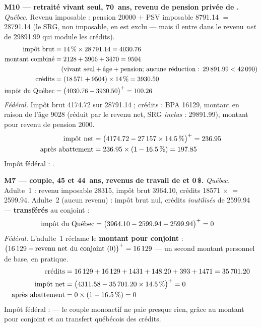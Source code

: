\medskip\noindent\textbf{M10 --- retraité vivant seul, 70~ans, revenu de pension privée de .}
\emph{Québec.} Revenu imposable : pension \num{20000} $+$ PSV
imposable \num{8791.14} $=$ \num{28791.14} (le SRG, non imposable, en est
exclu — mais il entre dans le revenu \emph{net} de \num{29891.99} qui
module les crédits).
\begin{align*}
\text{impôt brut} &= \num{14}\,\% \times \num{28791.14} = \num{4030.76} \\
\text{montant combiné} &= \num{2128} + \num{3906} + \num{3470} = \num{9504} \\
&\quad (\text{vivant seul} + \text{âge} + \text{pension; aucune réduction : } \num{29891.99} < \num{42090}) \\
\text{crédits} &= (\num{18571} + \num{9504}) \times \num{14}\,\% = \num{3930.50} \\
\text{impôt du Québec} &= \bigl(\num{4030.76} - \num{3930.50}\bigr)^{+} = \num{100.26}
\end{align*}
\emph{Fédéral.} Impôt brut \num{4174.72} sur \num{28791.14} ; crédits :
BPA \num{16129}, montant en raison de l'âge \num{9028}
(réduit par le revenu net, SRG \emph{inclus} : \num{29891.99}), montant pour
revenu de pension \num{2000}.
\begin{align*}
\text{impôt net} &= \bigl(\num{4174.72} - \num{27157} \times \num{14.5}\,\%\bigr)^{+} = \num{236.95} \\
\text{après abattement} &= \num{236.95} \times (1 - \num{16.5}\,\%) = \num{197.85}
\end{align*}
Impôt fédéral : .

\medskip\noindent\textbf{M7 --- couple, 45 et 44~ans, revenus de travail de  et 0\,\$.}
\emph{Québec.} Adulte~1 : revenu imposable \num{28315}, impôt brut
\num{3964.10}, crédits \num{18571} $\times$  $=$ \num{2599.94}.
Adulte~2 (aucun revenu) : impôt brut nul, crédits \emph{inutilisés} de
\num{2599.94} — \textbf{transférés} au conjoint :
\begin{align*}
\text{impôt du Québec} &= \bigl(\num{3964.10} - \num{2599.94} - \num{2599.94}\bigr)^{+} = \num{0}
\end{align*}
\emph{Fédéral.} L'adulte~1 réclame le \textbf{montant pour conjoint} :
$\bigl(\num{16129} - \text{revenu net du conjoint } (0)\bigr)^{+} = \num{16129}$ —
un second montant personnel de base, en pratique.
\begin{align*}
\text{crédits} &= \num{16129} + \num{16129} + \num{1431} + \num{148.20} + \num{393} + \num{1471} = \num{35701.20} \\
\text{impôt net} &= \bigl(\num{4311.58} - \num{35701.20} \times \num{14.5}\,\%\bigr)^{+} = \num{0} \\
\text{après abattement} &= \num{0} \times (1 - \num{16.5}\,\%) = \num{0}
\end{align*}
Impôt fédéral :  — le couple monoactif ne paie presque rien,
grâce au montant pour conjoint et au transfert québécois des crédits.
